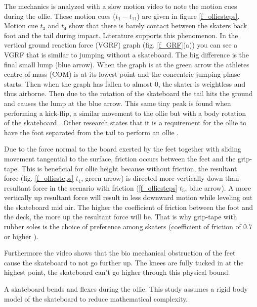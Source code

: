 \documentclass[default,iicol]{sn-jnl}
\theoremstyle{thmstyleone}%
\theoremstyle{thmstyletwo}%
\theoremstyle{thmstylethree}%
\begin{document}
The mechanics is analyzed with a slow motion video to note the motion cues during the ollie. These motion cues ($t_1-t_{11}$) are given in figure \ref{f_olliesteps}. Motion cue $t_3$ and $t_4$ show that there is barely contact between the skaters back foot and the tail during impact. Literature supports this phenomenon. In the vertical ground reaction force (VGRF) graph (fig. \ref{f_GRF}(a)) you can see a VGRF that is similar to jumping without a skateboard. The big difference is the final small lump (blue arrow). When the graph is at the green arrow the athletes centre of mass (COM) is at its lowest point and the concentric jumping phase starts. Then when the graph has fallen to almost 0, the skater is weightless and thus airborne. Then due to the rotation of the skateboard the tail hits the ground and causes the lump at the blue arrow. This same tiny peak is found when performing a kick-flip, a similar movement to the ollie but with a body rotation of the skateboard \cite{determan_kinetics_2006}. Other research states that it is a requirement for the ollie to have the foot separated from the tail to perform an ollie \cite{nakashima_simulation_2021}. 

Due to the force normal to the board exerted by the feet together with sliding movement tangential to the surface, friction occurs between the feet and the grip-tape. This is beneficial for ollie height because without friction, the resultant force (fig. \ref{f_olliesteps} $t_4$, green arrow) is directed more vertically down than resultant force in the scenario with friction (\ref{f_olliesteps} $t_5$, blue arrow). A more vertically up resultant force will result in less downward motion while leveling out the skateboard mid air. The higher the coefficient of friction between the foot and the deck, the more up the resultant force will be. That is why grip-tape with rubber soles is the choice of preference among skaters (coefficient of friction of 0.7 or higher \cite{bron_nog_nodate}). 

Furthermore the video shows that the bio mechanical obstruction of the feet cause the skateboard to not go further up. The knees are fully tucked in at the highest point, the skateboard can't go higher through this physical bound. 

A skateboard bends and flexes during the ollie. This study assumes a rigid body model of the skateboard to reduce mathematical complexity.
\end{document}
